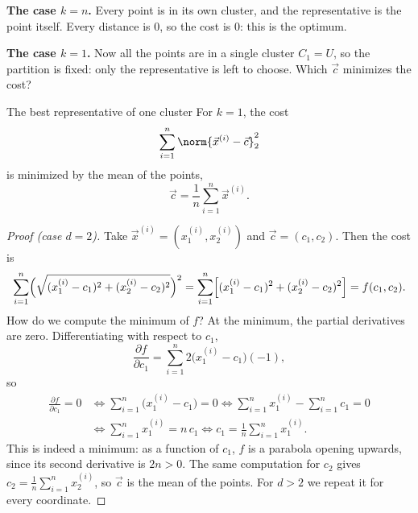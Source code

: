 \documentclass[a4paper,12pt,oneside]{report}
\begin{document}
\textbf{The case $k=n$.} Every point is in its own cluster, and the
representative is the point itself. Every distance is $0$, so the cost
is $0$: this is the optimum.
\begin{center}
\end{center}

\textbf{The case $k=1$.} Now all the points are in a single cluster
$C_1=U$, so the partition is fixed: only the representative is left to
choose. Which $\vec c$ minimizes the cost?
\begin{center}
\end{center}

\begin{framedprop}{The best representative of one cluster}
\label{prop:k-means-one}
For $k=1$, the cost
\[
  \sum_{i=1}^{n}\norm{\vec x^{(i)}-\vec c}_2^2
\]
is minimized by the mean of the points,
\[
  \vec c=\frac1n\sum_{i=1}^{n}\vec x^{(i)} .
\]
\end{framedprop}

\begin{proof}[Proof (case $d=2$)]
Take $\vec x^{(i)}=(x^{(i)}_1,x^{(i)}_2)$ and $\vec c=(c_1,c_2)$. Then the
cost is
\[
  \sum_{i=1}^{n}\Bigl(\sqrt{(x^{(i)}_1-c_1)^2+(x^{(i)}_2-c_2)^2}\Bigr)^2
  =\sum_{i=1}^{n}\Bigl[(x^{(i)}_1-c_1)^2+(x^{(i)}_2-c_2)^2\Bigr]
  =f(c_1,c_2).
\]
How do we compute the minimum of $f$? At the minimum, the partial
derivatives are zero. Differentiating with respect to $c_1$,
\[
  \frac{\partial f}{\partial c_1}
  =\sum_{i=1}^{n}2\bigl(x^{(i)}_1-c_1\bigr)(-1),
\]
so
\[
\begin{aligned}
  \frac{\partial f}{\partial c_1}=0
  &\iff\sum_{i=1}^{n}\bigl(x^{(i)}_1-c_1\bigr)=0
  \iff\sum_{i=1}^{n}x^{(i)}_1-\sum_{i=1}^{n}c_1=0\\
  &\iff\sum_{i=1}^{n}x^{(i)}_1=n\,c_1
  \iff c_1=\frac1n\sum_{i=1}^{n}x^{(i)}_1 .
\end{aligned}
\]
This is indeed a minimum: as a function of $c_1$, $f$ is a parabola
opening upwards, since its second derivative is $2n>0$. The same
computation for $c_2$ gives $c_2=\frac1n\sum_{i=1}^{n}x^{(i)}_2$, so
$\vec c$ is the mean of the points. For $d>2$ we repeat it for every
coordinate.
\end{proof}
\end{document}
